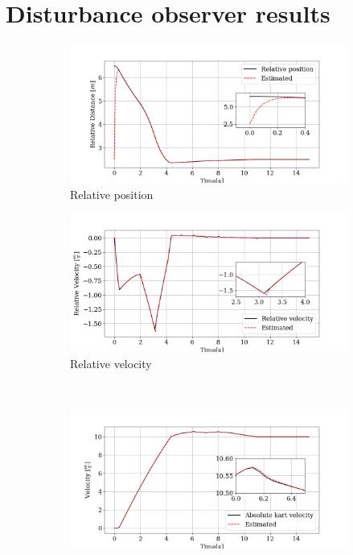 \documentclass[a4paper,12pt,oneside]{book}
\begin{document}
\section{Disturbance observer results}

\begin{figure}[h!]
    \centering
    \begin{subfigure}[b]{0.49\textwidth}
        \includegraphics[width=\textwidth]{Estimator/Deltap.png}
    \caption{Relative position}
    \label{state1}
    \end{subfigure}
    \hfill
    \begin{subfigure}[b]{0.49\textwidth}
        \includegraphics[width=\textwidth]{Estimator/Deltav.png}
    \caption{Relative velocity}
    \end{subfigure}
    \\[0.2cm]
    \begin{subfigure}[b]{0.49\textwidth}
        \includegraphics[width=\textwidth]{Estimator/vk.png}

\end{subfigure}
\end{figure}
\end{document}
